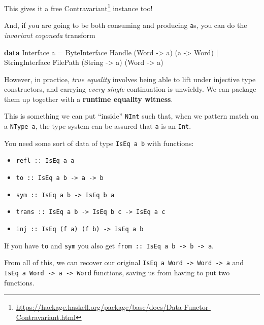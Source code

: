 \documentclass[]{article}
\newenvironment{Shaded}{}{}
\newcommand{\DataTypeTok}[1]{\textcolor[rgb]{0.56,0.13,0.00}{#1}}
\newcommand{\KeywordTok}[1]{\textcolor[rgb]{0.00,0.44,0.13}{\textbf{#1}}}
\newcommand{\NormalTok}[1]{#1}
\newcommand{\OperatorTok}[1]{\textcolor[rgb]{0.40,0.40,0.40}{#1}}
\newcommand{\OtherTok}[1]{\textcolor[rgb]{0.00,0.44,0.13}{#1}}
\renewcommand{\href}[2]{#2\footnote{\url{#1}}}
\begin{document}
This gives it a free
\href{https://hackage.haskell.org/package/base/docs/Data-Functor-Contravariant.html}{Contravariant}
instance too!

And, if you are going to be both consuming and producing \texttt{a}s, you can do
the \emph{invariant coyoneda} transform

\begin{Shaded}
\begin{Highlighting}[]
\KeywordTok{data} \DataTypeTok{Interface}\NormalTok{ a }\OtherTok{=}
    \DataTypeTok{ByteInterface} \DataTypeTok{Handle}\NormalTok{ (}\DataTypeTok{Word} \OtherTok{{-}\textgreater{}}\NormalTok{ a) (a }\OtherTok{{-}\textgreater{}} \DataTypeTok{Word}\NormalTok{)}
  \OperatorTok{|} \DataTypeTok{StringInterface} \DataTypeTok{FilePath}\NormalTok{ (}\DataTypeTok{String} \OtherTok{{-}\textgreater{}}\NormalTok{ a) (}\DataTypeTok{Word} \OtherTok{{-}\textgreater{}}\NormalTok{ a)}
\end{Highlighting}
\end{Shaded}

However, in practice, \emph{true equality} involves being able to lift under
injective type constructors, and carrying \emph{every single} continuation is
unwieldy. We can package them up together with a \textbf{runtime equality
witness}.

This is something we can put ``inside'' \texttt{NInt} such that, when we pattern
match on a \texttt{NType\ a}, the type system can be assured that \texttt{a} is
an \texttt{Int}.

You need some sort of data of type \texttt{IsEq\ a\ b} with functions:

\begin{itemize}
\tightlist
\item
  \texttt{refl\ ::\ IsEq\ a\ a}
\item
  \texttt{to\ ::\ IsEq\ a\ b\ -\textgreater{}\ a\ -\textgreater{}\ b}
\item
  \texttt{sym\ ::\ IsEq\ a\ b\ -\textgreater{}\ IsEq\ b\ a}
\item
  \texttt{trans\ ::\ IsEq\ a\ b\ -\textgreater{}\ IsEq\ b\ c\ -\textgreater{}\ IsEq\ a\ c}
\item
  \texttt{inj\ ::\ IsEq\ (f\ a)\ (f\ b)\ -\textgreater{}\ IsEq\ a\ b}
\end{itemize}

If you have \texttt{to} and \texttt{sym} you also get
\texttt{from\ ::\ IsEq\ a\ b\ -\textgreater{}\ b\ -\textgreater{}\ a}.

From all of this, we can recover our original
\texttt{IsEq\ a\ Word\ -\textgreater{}\ Word\ -\textgreater{}\ a} and
\texttt{IsEq\ a\ Word\ -\textgreater{}\ a\ -\textgreater{}\ Word} functions,
saving us from having to put two functions.
\end{document}

